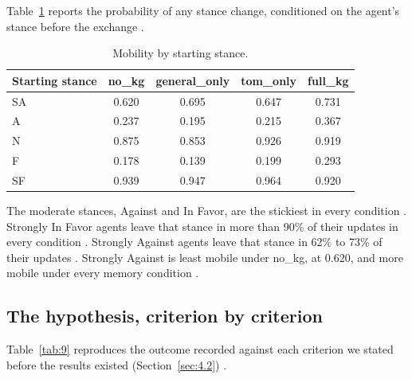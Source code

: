 \documentclass[11pt,a4paper]{article}
\newcommand{\src}[1]{\unskip\marginpar{\raggedright\tiny\textcolor{gray}{#1}}}
\newcommand{\src}[1]{\unskip}
\newcommand{\cond}[1]{\textsf{#1}}
\begin{document}
Table~\ref{tab:8} reports the probability of any stance change, conditioned on the agent's stance before the exchange \src{R: full\_ablation\_summary.md, Section 3.3}.

\begin{table}[htbp]
\centering
\small
\caption{Mobility by starting stance.}
\label{tab:8}
\begin{tabular}{lcccc}
\toprule
Starting stance & \cond{no\_kg} & \cond{general\_only} & \cond{tom\_only} & \cond{full\_kg} \\
\midrule
SA & 0.620 & 0.695 & 0.647 & 0.731 \\
A & 0.237 & 0.195 & 0.215 & 0.367 \\
N & 0.875 & 0.853 & 0.926 & 0.919 \\
F & 0.178 & 0.139 & 0.199 & 0.293 \\
SF & 0.939 & 0.947 & 0.964 & 0.920 \\
\bottomrule
\end{tabular}
\end{table}

The moderate stances, Against and In Favor, are the stickiest in every condition \src{R: full\_ablation\_summary.md, Section 3.3}. Strongly In Favor agents leave that stance in more than 90\% of their updates in every condition \src{R: full\_ablation\_summary.md, Section 3.3}. Strongly Against agents leave that stance in 62\% to 73\% of their updates \src{R: full\_ablation\_summary.md, Section 3.3}. Strongly Against is least mobile under \cond{no\_kg}, at 0.620, and more mobile under every memory condition \src{R: full\_ablation\_summary.md, Section 3.3}.

\subsection{The hypothesis, criterion by criterion}\label{sec:5.6}

Table~\ref{tab:9} reproduces the outcome recorded against each criterion we stated before the results existed (Section~\ref{sec:4.2}) \src{hypothesis\_and\_scope.md, "Outcome", "Criterion by criterion"}.
\end{document}
